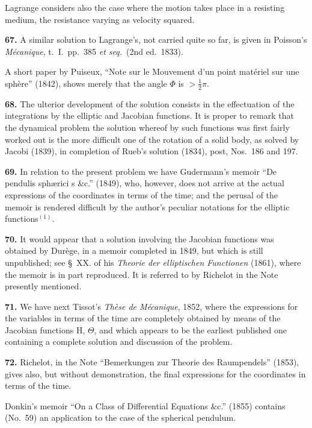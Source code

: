 \documentclass[11pt,a4paper]{article}
\theoremstyle{definition}
\begin{document}
Lagrange considers also the case where the motion takes place in a resisting medium, the resistance varying as velocity squared.

\textbf{67.} A similar solution to Lagrange's, not carried quite so far, is given in Poisson's \textit{M\'ecanique}, t.~I.~pp.~385 \textit{et seq.}~(2nd ed.~1833).

A short paper by Puiseux, ``Note sur le Mouvement d'un point mat\'eriel sur une sph\`ere'' (1842), shows merely that the angle $\Phi$ is $> \frac{1}{2}\pi$.

\textbf{68.} The ulterior development of the solution consists in the effectuation of the integrations by the elliptic and Jacobian functions. It is proper to remark that the dynamical problem the solution whereof by such functions was first fairly worked out is the more difficult one of the rotation of a solid body, as solved by Jacobi (1839), in completion of Rueb's solution (1834), post, Nos.~186 and 197.

\textbf{69.} In relation to the present problem we have Gudermann's memoir ``De pendulis sph\ae rici s \&c.'' (1849), who, however, does not arrive at the actual expressions of the coordinates in terms of the time; and the perusal of the memoir is rendered difficult by the author's peculiar notations for the elliptic functions$^{(1)}$.


\textbf{70.} It would appear that a solution involving the Jacobian functions was obtained by Dur\`ege, in a memoir completed in 1849, but which is still unpublished; see \S~XX. of his \textit{Theorie der elliptischen Functionen} (1861), where the memoir is in part reproduced. It is referred to by Richelot in the Note presently mentioned.

\textbf{71.} We have next Tissot's \textit{Th\`ese de M\'ecanique}, 1852, where the expressions for the variables in terms of the time are completely obtained by means of the Jacobian functions H, $\Theta$, and which appears to be the earliest published one containing a complete solution and discussion of the problem.

\textbf{72.} Richelot, in the Note ``Bemerkungen zur Theorie des Raumpendels'' (1853), gives also, but without demonstration, the final expressions for the coordinates in terms of the time.

Donkin's memoir ``On a Class of Differential Equations \&c.'' (1855) contains (No.~59) an application to the case of the spherical pendulum.
\end{document}
